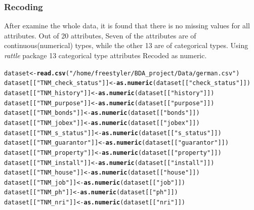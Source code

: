 \documentclass{article}\usepackage[]{graphicx}\usepackage[]{color}
\makeatletter
\newcommand{\hlstr}[1]{\textcolor[rgb]{0.192,0.494,0.8}{#1}}%
\newcommand{\hlstd}[1]{\textcolor[rgb]{0.345,0.345,0.345}{#1}}%
\newcommand{\hlkwb}[1]{\textcolor[rgb]{0.69,0.353,0.396}{#1}}%
\newcommand{\hlkwd}[1]{\textcolor[rgb]{0.737,0.353,0.396}{\textbf{#1}}}%
\newenvironment{kframe}{%
 \def\at@end@of@kframe{}%
 \ifinner\ifhmode%
  \def\at@end@of@kframe{\end{minipage}}%
  \begin{minipage}{\columnwidth}%
 \fi\fi%
 \def\FrameCommand##1{\hskip\@totalleftmargin \hskip-\fboxsep
 \colorbox{shadecolor}{##1}\hskip-\fboxsep
     \hskip-\linewidth \hskip-\@totalleftmargin \hskip\columnwidth}%
 \MakeFramed {\advance\hsize-\width
   \@totalleftmargin\z@ \linewidth\hsize
   \@setminipage}}%
 {\par\unskip\endMakeFramed%
 \at@end@of@kframe}
\newenvironment{knitrout}{}{} %
\makeatother
\begin{document}
\subsubsection{Recoding}\hspace{0.5cm}After examine the whole data, it is found that there is no missing values for all attributes. Out of 20 attributes, Seven of the attributes are of continuous(numerical) types, while the other 13 are of categorical types. Using \textit{rattle} package 13 categorical type attributes Recoded as numeric.
\begin{knitrout}
\color{fgcolor}\begin{kframe}
\begin{alltt}
\hlstd{dataset} \hlkwb{<-} \hlkwd{read.csv}\hlstd{(}\hlstr{"/home/freestyler/BDA_project/Data/german.csv"}\hlstd{)}
 \hlstd{dataset[[}\hlstr{"TNM_check_status"}\hlstd{]]} \hlkwb{<-} \hlkwd{as.numeric}\hlstd{( dataset[[}\hlstr{"check_status"}\hlstd{]])}
 \hlstd{dataset[[}\hlstr{"TNM_history"}\hlstd{]]} \hlkwb{<-} \hlkwd{as.numeric}\hlstd{( dataset[[}\hlstr{"history"}\hlstd{]])}
 \hlstd{dataset[[}\hlstr{"TNM_purpose"}\hlstd{]]} \hlkwb{<-} \hlkwd{as.numeric}\hlstd{( dataset[[}\hlstr{"purpose"}\hlstd{]])}
 \hlstd{dataset[[}\hlstr{"TNM_bonds"}\hlstd{]]} \hlkwb{<-} \hlkwd{as.numeric}\hlstd{( dataset[[}\hlstr{"bonds"}\hlstd{]])}
 \hlstd{dataset[[}\hlstr{"TNM_jobex"}\hlstd{]]} \hlkwb{<-} \hlkwd{as.numeric}\hlstd{( dataset[[}\hlstr{"jobex"}\hlstd{]])}
 \hlstd{dataset[[}\hlstr{"TNM_s_status"}\hlstd{]]} \hlkwb{<-} \hlkwd{as.numeric}\hlstd{( dataset[[}\hlstr{"s_status"}\hlstd{]])}
 \hlstd{dataset[[}\hlstr{"TNM_guarantor"}\hlstd{]]} \hlkwb{<-} \hlkwd{as.numeric}\hlstd{( dataset[[}\hlstr{"guarantor"}\hlstd{]])}
 \hlstd{dataset[[}\hlstr{"TNM_property"}\hlstd{]]} \hlkwb{<-} \hlkwd{as.numeric}\hlstd{( dataset[[}\hlstr{"property"}\hlstd{]])}
 \hlstd{dataset[[}\hlstr{"TNM_install"}\hlstd{]]} \hlkwb{<-} \hlkwd{as.numeric}\hlstd{( dataset[[}\hlstr{"install"}\hlstd{]])}
 \hlstd{dataset[[}\hlstr{"TNM_house"}\hlstd{]]} \hlkwb{<-} \hlkwd{as.numeric}\hlstd{( dataset[[}\hlstr{"house"}\hlstd{]])}
 \hlstd{dataset[[}\hlstr{"TNM_job"}\hlstd{]]} \hlkwb{<-} \hlkwd{as.numeric}\hlstd{( dataset[[}\hlstr{"job"}\hlstd{]])}
 \hlstd{dataset[[}\hlstr{"TNM_ph"}\hlstd{]]} \hlkwb{<-} \hlkwd{as.numeric}\hlstd{( dataset[[}\hlstr{"ph"}\hlstd{]])}
 \hlstd{dataset[[}\hlstr{"TNM_nri"}\hlstd{]]} \hlkwb{<-} \hlkwd{as.numeric}\hlstd{( dataset[[}\hlstr{"nri"}\hlstd{]])}
\end{alltt}
\end{kframe}
\end{knitrout}
\end{document}
